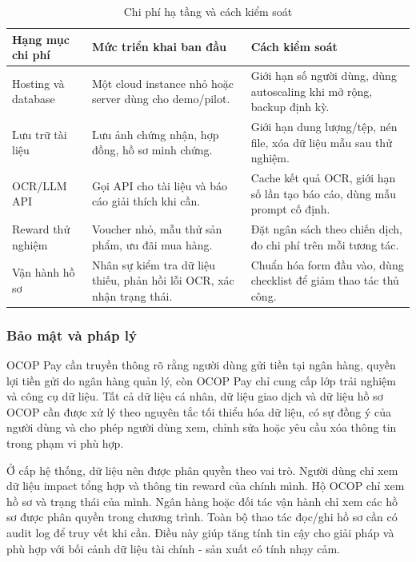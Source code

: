\documentclass[13pt,a4paper]{extarticle}
\begin{document}
\begin{table}[H]
\centering
\caption{Chi phí hạ tầng và cách kiểm soát}
\begin{tabular}{|p{3cm}|p{5cm}|p{5cm}|}
\hline
\textbf{Hạng mục chi phí} & \textbf{Mức triển khai ban đầu} & \textbf{Cách kiểm soát} \\
\hline
Hosting và database & Một cloud instance nhỏ hoặc server dùng cho demo/pilot. & Giới hạn số người dùng, dùng autoscaling khi mở rộng, backup định kỳ. \\
\hline
Lưu trữ tài liệu & Lưu ảnh chứng nhận, hợp đồng, hồ sơ minh chứng. & Giới hạn dung lượng/tệp, nén file, xóa dữ liệu mẫu sau thử nghiệm. \\
\hline
OCR/LLM API & Gọi API cho tài liệu và báo cáo giải thích khi cần. & Cache kết quả OCR, giới hạn số lần tạo báo cáo, dùng mẫu prompt cố định. \\
\hline
Reward thử nghiệm & Voucher nhỏ, mẫu thử sản phẩm, ưu đãi mua hàng. & Đặt ngân sách theo chiến dịch, đo chi phí trên mỗi tương tác. \\
\hline
Vận hành hồ sơ & Nhân sự kiểm tra dữ liệu thiếu, phản hồi lỗi OCR, xác nhận trạng thái. & Chuẩn hóa form đầu vào, dùng checklist để giảm thao tác thủ công. \\
\hline
\end{tabular}
\end{table}

\subsubsection{Bảo mật và pháp lý}

OCOP Pay cần truyền thông rõ rằng người dùng gửi tiền tại ngân hàng, quyền lợi tiền gửi do ngân hàng quản lý, còn OCOP Pay chỉ cung cấp lớp trải nghiệm và công cụ dữ liệu. Tất cả dữ liệu cá nhân, dữ liệu giao dịch và dữ liệu hồ sơ OCOP cần được xử lý theo nguyên tắc tối thiểu hóa dữ liệu, có sự đồng ý của người dùng và cho phép người dùng xem, chỉnh sửa hoặc yêu cầu xóa thông tin trong phạm vi phù hợp.

Ở cấp hệ thống, dữ liệu nên được phân quyền theo vai trò. Người dùng chỉ xem dữ liệu impact tổng hợp và thông tin reward của chính mình. Hộ OCOP chỉ xem hồ sơ và trạng thái của mình. Ngân hàng hoặc đối tác vận hành chỉ xem các hồ sơ được phân quyền trong chương trình. Toàn bộ thao tác đọc/ghi hồ sơ cần có audit log để truy vết khi cần. Điều này giúp tăng tính tin cậy cho giải pháp và phù hợp với bối cảnh dữ liệu tài chính - sản xuất có tính nhạy cảm.
\end{document}
